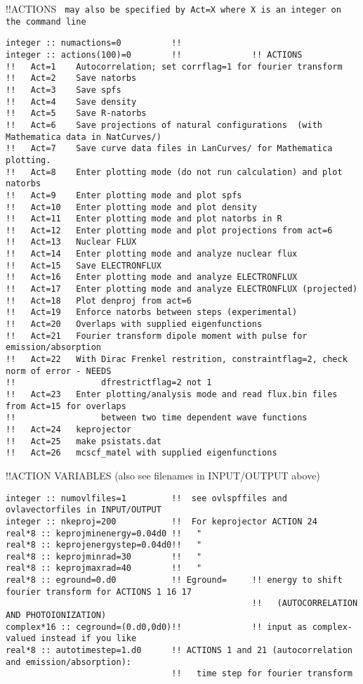 !!{\large \quad ACTIONS} \verb# may also be specified by Act=X where X is an integer on the command line #
\begin{verbatim}
integer :: numactions=0          !! 
integer :: actions(100)=0        !!              !! ACTIONS
!!   Act=1    Autocorrelation; set corrflag=1 for fourier transform
!!   Act=2    Save natorbs
!!   Act=3    Save spfs
!!   Act=4    Save density
!!   Act=5    Save R-natorbs
!!   Act=6    Save projections of natural configurations  (with Mathematica data in NatCurves/)
!!   Act=7    Save curve data files in LanCurves/ for Mathematica plotting.
!!   Act=8    Enter plotting mode (do not run calculation) and plot natorbs 
!!   Act=9    Enter plotting mode and plot spfs
!!   Act=10   Enter plotting mode and plot density
!!   Act=11   Enter plotting mode and plot natorbs in R
!!   Act=12   Enter plotting mode and plot projections from act=6
!!   Act=13   Nuclear FLUX 
!!   Act=14   Enter plotting mode and analyze nuclear flux
!!   Act=15   Save ELECTRONFLUX
!!   Act=16   Enter plotting mode and analyze ELECTRONFLUX 
!!   Act=17   Enter plotting mode and analyze ELECTRONFLUX (projected)
!!   Act=18   Plot denproj from act=6
!!   Act=19   Enforce natorbs between steps (experimental)
!!   Act=20   Overlaps with supplied eigenfunctions
!!   Act=21   Fourier transform dipole moment with pulse for emission/absorption
!!   Act=22   With Dirac Frenkel restrition, constraintflag=2, check norm of error - NEEDS
!!                 dfrestrictflag=2 not 1
!!   Act=23   Enter plotting/analysis mode and read flux.bin files from Act=15 for overlaps
!!                 between two time dependent wave functions
!!   Act=24   keprojector
!!   Act=25   make psistats.dat
!!   Act=26   mcscf_matel with supplied eigenfunctions 
\end{verbatim}
!!{\large \quad ACTION VARIABLES (also see filenames in INPUT/OUTPUT above)}
\begin{verbatim}
integer :: numovlfiles=1         !!  see ovlspffiles and ovlavectorfiles in INPUT/OUTPUT
integer :: nkeproj=200           !!  For keprojector ACTION 24
real*8 :: keprojminenergy=0.04d0 !!   "
real*8 :: keprojenergystep=0.04d0!!   "
real*8 :: keprojminrad=30        !!   "
real*8 :: keprojmaxrad=40        !!   "
real*8 :: eground=0.d0           !! Eground=     !! energy to shift fourier transform for ACTIONS 1 16 17
                                                 !!   (AUTOCORRELATION AND PHOTOIONIZATION)
complex*16 :: ceground=(0.d0,0d0)!!              !! input as complex-valued instead if you like
real*8 :: autotimestep=1.d0      !! ACTIONS 1 and 21 (autocorrelation and emission/absorption):
                                 !!   time step for fourier transform
\end{verbatim}
